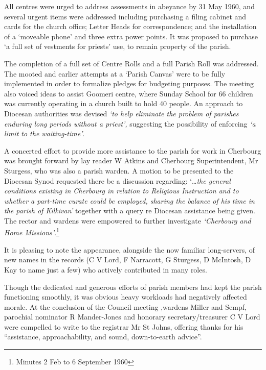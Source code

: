 All centres were urged to address assessments in abeyance by 31 May 1960, and several urgent items were addressed including purchasing a filing cabinet and cards for the church office; Letter Heads for correspondence; and the installation of a `moveable phone' and three extra power points. It was proposed to purchase `a full set of vestments for priests' use, to remain property of the parish.



The completion of a full set of Centre Rolls and a full Parish Roll was addressed. The mooted and earlier attempts at a `Parish Canvas' were to be fully implemented in order to formalize pledges for budgeting purposes. The meeting also voiced ideas to assist Goomeri centre, where Sunday School for 66 children was currently operating in a church built to hold 40 people. An approach to Diocesan authorities was devised \emph{`to help eliminate the problem of parishes enduring long periods without a priest',} suggesting the possibility of enforcing \emph{`a limit to the waiting-time'}.



A concerted effort to provide more assistance to the parish for work in Cherbourg was brought forward by lay reader W Atkins and Cherbourg Superintendent, Mr Sturgess, who was also a parish warden. A motion to be presented to the Diocesan Synod requested there be a discussion regarding: `\ldots{}\emph{the general conditions existing in Cherbourg in relation to Religious Instruction and to whether a part-time curate could be employed, sharing the balance of his time in the parish of Kilkivan'} together with a query re Diocesan assistance being given. The rector and wardens were empowered to further investigate \emph{`Cherbourg and Home Missions'}.\footnote{Minutes 2 Feb to 6 September 1960}


It is pleasing to note the appearance, alongside the now familiar long-servers, of new names in the records (C V Lord, F Narracott, G Sturgess, D McIntosh, D Kay to name just a few) who actively contributed in many roles.



Though the dedicated and generous efforts of parish members had kept the parish functioning smoothly, it was obvious heavy workloads had negatively affected morale. At the conclusion of the Council meeting ,wardens Miller and Sempf, parochial nominator R Mander-Jones and honorary secretary/treasurer C V Lord were compelled to write to the registrar Mr St Johns, offering thanks for his ``assistance, approachability, and sound, down-to-earth advice''.




